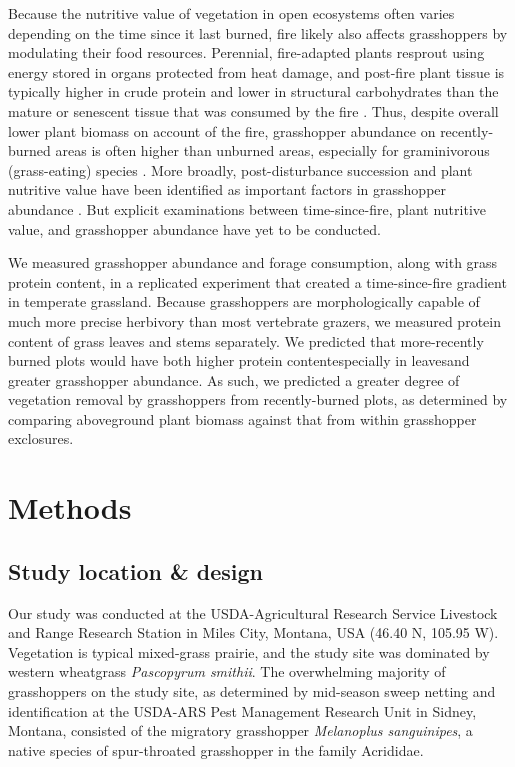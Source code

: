 \documentclass[referee, 
	            sn-basic]
           {sn-jnl}
\begin{document}
\begin{linenumbers}
Because the nutritive value of vegetation in open ecosystems often varies depending on the time since it last burned, fire likely also affects grasshoppers by modulating their food resources. 
Perennial, fire-adapted plants resprout using energy stored in organs protected from heat damage, and post-fire plant tissue is typically higher in crude protein and lower in structural carbohydrates than the mature or senescent tissue that was consumed by the fire \citep{mcgranahan2021}. 
Thus, despite overall lower plant biomass on account of the fire, grasshopper abundance on recently-burned areas is often higher than unburned areas, especially for graminivorous (grass-eating) species \citep{meyer2002}. 
More broadly, post-disturbance succession and plant nutritive value have been identified as important factors in grasshopper abundance \citep{fartmann2012, schirmel2019}. 
But explicit examinations between time-since-fire, plant nutritive value, and grasshopper abundance have yet to be conducted. 

We measured grasshopper abundance and forage consumption, along with grass protein content, in a replicated experiment that created a time-since-fire gradient in temperate grassland.  
Because grasshoppers are morphologically capable of much more precise herbivory than most vertebrate grazers, we measured protein content of grass leaves and stems separately.
We predicted that more-recently burned plots would have both higher protein content\textemdash especially in leaves\textemdash and greater grasshopper abundance. 
As such, we predicted a greater degree of vegetation removal by grasshoppers from recently-burned plots, as determined by comparing aboveground plant biomass against that from within grasshopper exclosures. 

\section{Methods}

\subsection{Study location \& design} 

Our study was conducted at the USDA-Agricultural Research Service Livestock and Range Research Station in Miles City, Montana, USA (46.40 N, 105.95 W).  
Vegetation is typical mixed-grass prairie, and the study site was dominated by western wheatgrass \emph{Pascopyrum smithii}.  
The overwhelming majority of grasshoppers on the study site, as determined by mid-season sweep netting and identification at the USDA-ARS Pest Management Research Unit in Sidney, Montana, consisted of the migratory grasshopper \emph{Melanoplus sanguinipes}, a native species of spur-throated grasshopper in the family Acrididae. 


\end{linenumbers}
\end{document}

